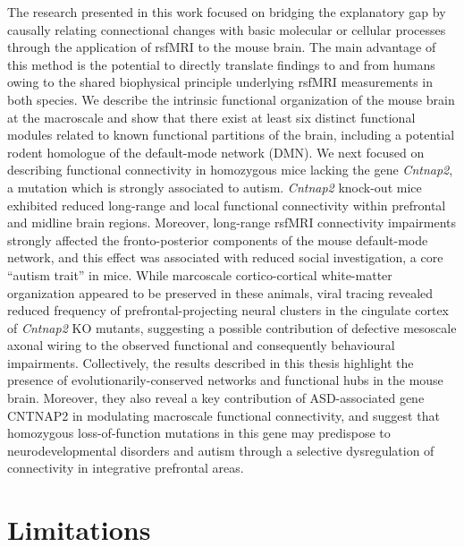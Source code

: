 The research presented in this work focused on bridging the explanatory gap by
causally relating connectional changes with basic molecular or cellular
processes through the application of rsfMRI to the mouse brain. The main
advantage of this method is the potential to directly translate findings to and
from humans owing to the shared biophysical principle underlying rsfMRI
measurements in both species. We describe the intrinsic functional organization
of the mouse brain at the macroscale and show that there exist at least six
distinct functional modules related to known functional partitions of the brain,
including a potential rodent homologue of the default-mode network (DMN). We
next focused on describing functional connectivity in homozygous mice lacking
the gene \textit{Cntnap2}, a mutation which is strongly associated to autism.
\textit{Cntnap2} knock-out mice exhibited reduced long-range and local
functional connectivity within prefrontal and midline brain regions.  Moreover,
long-range rsfMRI connectivity impairments strongly affected the
fronto-posterior components of the mouse default-mode network, and this effect
was associated with reduced social investigation, a core ``autism trait'' in
mice. While marcoscale cortico-cortical white-matter organization appeared to be
preserved in these animals, viral tracing revealed reduced frequency of
prefrontal-projecting neural clusters in the cingulate cortex of
\textit{Cntnap2} KO mutants, suggesting a possible contribution of defective
mesoscale axonal wiring to the observed functional and consequently behavioural
impairments. Collectively, the results described in this thesis highlight the
presence of evolutionarily-conserved networks and functional hubs in the mouse
brain.  Moreover, they also reveal a key contribution of ASD-associated gene
CNTNAP2 in modulating macroscale functional connectivity, and suggest that
homozygous loss-of-function mutations in this gene may predispose to
neurodevelopmental disorders and autism through a selective dysregulation of
connectivity in integrative prefrontal areas. 

\section{Limitations}


